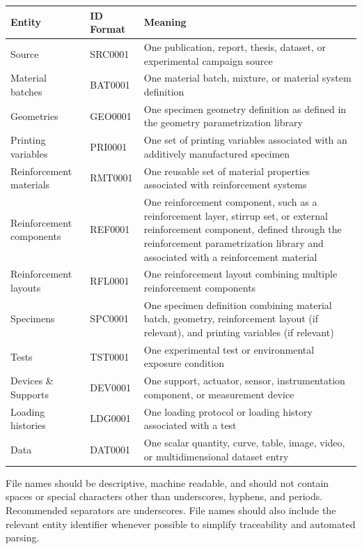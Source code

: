 \documentclass[11pt]{book}
\begin{document}
\begin{longtable}{p{}p{}p{}}
\toprule
\textbf{Entity} & \textbf{ID Format} & \textbf{Meaning} \\
\midrule
Source & SRC0001 & One publication, report, thesis, dataset, or experimental campaign source \\
Material batches & BAT0001 & One material batch, mixture, or material system definition \\
Geometries & GEO0001 & One specimen geometry definition as defined in the geometry parametrization library \\
Printing variables & PRI0001 & One set of printing variables associated with an additively manufactured specimen \\
Reinforcement materials & RMT0001 & One reusable set of material properties associated with reinforcement systems \\
Reinforcement components & REF0001 & One reinforcement component, such as a reinforcement layer, stirrup set, or external reinforcement component, defined through the reinforcement parametrization library and associated with a reinforcement material \\
Reinforcement layouts & RFL0001 & One reinforcement layout combining multiple reinforcement components \\
Specimens & SPC0001 & One specimen definition combining material batch, geometry, reinforcement layout (if relevant), and printing variables (if relevant) \\
Tests & TST0001 & One experimental test or environmental exposure condition \\
Devices \& Supports & DEV0001 & One support, actuator, sensor, instrumentation component, or measurement device \\
Loading histories & LDG0001 & One loading protocol or loading history associated with a test \\
Data & DAT0001 & One scalar quantity, curve, table, image, video, or multidimensional dataset entry \\
\bottomrule
\end{longtable}

File names should be descriptive, machine readable, and should not contain spaces or special characters other than underscores, hyphens, and periods. Recommended separators are underscores. File names should also include the relevant entity identifier whenever possible to simplify traceability and automated parsing.
\end{document}
